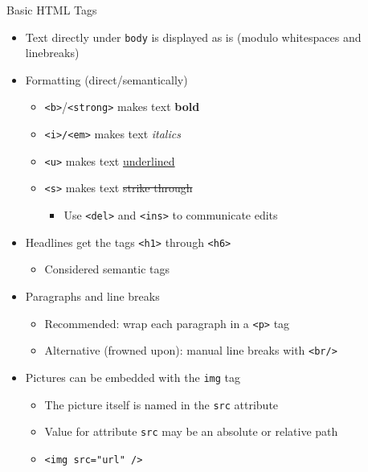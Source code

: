 \begin{frame}{Basic HTML Tags}
%
\begin{itemize}
\item Text directly under \texttt{body} is displayed as is (modulo whitespaces and linebreaks)
\pause
\item Formatting (direct/semantically)
	\begin{itemize}
	\item \texttt{<b>}/\texttt{<strong>} makes text \textbf{bold}
	\item \texttt{<i>/\texttt{<em>}} makes text \emph{italics}
	\item \texttt{<u>} makes text \underline{underlined}
	\item \texttt{<s>} makes text \sout{strike through}
		\begin{itemize}
		\item Use \texttt{<del>} and \texttt{<ins>} to communicate edits
		\end{itemize}
	\end{itemize}
\pause
\item Headlines get the tags \texttt{<h1>} through \texttt{<h6>} 
	\begin{itemize}
	\item Considered semantic tags
	\end{itemize}
\pause
\item Paragraphs and line breaks
	\begin{itemize}
	\item Recommended: wrap each paragraph in a \texttt{<p>} tag
	\item Alternative (frowned upon): manual line breaks with \texttt{<br/>}
	\end{itemize}
\pause
\item Pictures can be embedded with the \texttt{img} tag
	\begin{itemize}
	\item The picture itself is named in the \texttt{src} attribute
	\item Value for attribute \texttt{src} may be an absolute or relative path
	\item[\Thus] \texttt{<img src="url" />}
	\end{itemize}
\end{itemize}
%
\end{frame}


